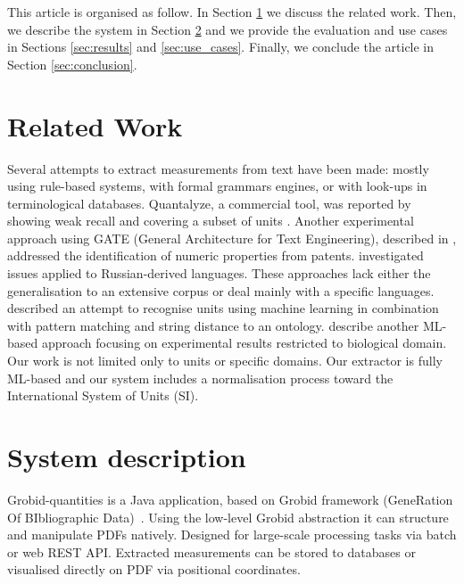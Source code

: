 \documentclass[sigconf]{acmart}
\begin{document}
This article is organised as follow. In Section \ref{sec:related_work} we discuss the related work. Then, we describe the system in Section \ref{sec:system} and we provide the evaluation and use cases in Sections \ref{sec:results} and \ref{sec:use_cases}. Finally, we conclude the article in Section \ref{sec:conclusion}.

\section{Related Work}
\label{sec:related_work}
Several attempts to extract measurements from text have been made: mostly using rule-based systems, with formal grammars engines, or with look-ups in terminological databases. Quantalyze, a commercial tool, was reported by  \cite{hundman2017measurement} showing weak recall and covering a subset of units \cite{aras2014applications}. Another experimental approach using GATE (General Architecture for Text Engineering), described in \cite{agatonovic2008large}, addressed the identification of numeric properties from patents. \cite{am2013processing} investigated issues applied to Russian-derived languages. These approaches lack either the generalisation to an extensive corpus or deal mainly with a specific languages. \cite{berrahou2013extract} described an attempt to recognise units using machine learning in combination with pattern matching and string distance to an ontology. \cite{kang_extracting_2013} describe another ML-based approach focusing on experimental results restricted to biological domain. Our work is not limited only to units or specific domains. Our extractor is fully ML-based and our system includes a normalisation process toward the International System of Units (SI). 

\section{System description}
\label{sec:system}
Grobid-quantities is a Java application, based on Grobid framework (GeneRation Of BIbliographic Data)~\cite{GROBID}. Using the low-level Grobid abstraction it can structure and manipulate PDFs natively. Designed for large-scale processing tasks via batch or web REST API. Extracted measurements can be stored to databases or visualised directly on PDF via positional coordinates.
\end{document}
